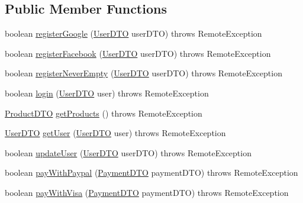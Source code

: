 \subsection*{Public Member Functions}
\begin{DoxyCompactItemize}
\item 
boolean \mbox{\hyperlink{interface_s_p_q_1_1remote_1_1_i_never_empty_facade_a93f3250c09a26fdb1d65219599dfd542}{register\+Google}} (\mbox{\hyperlink{class_s_p_q_1_1dto_1_1_user_d_t_o}{User\+D\+TO}} user\+D\+TO)  throws Remote\+Exception
\item 
boolean \mbox{\hyperlink{interface_s_p_q_1_1remote_1_1_i_never_empty_facade_a7b2f025522489fe9070d09a4fb08f0a1}{register\+Facebook}} (\mbox{\hyperlink{class_s_p_q_1_1dto_1_1_user_d_t_o}{User\+D\+TO}} user\+D\+TO)  throws Remote\+Exception
\item 
boolean \mbox{\hyperlink{interface_s_p_q_1_1remote_1_1_i_never_empty_facade_a7867e1e698fea32a535a1daeda4e8d6a}{register\+Never\+Empty}} (\mbox{\hyperlink{class_s_p_q_1_1dto_1_1_user_d_t_o}{User\+D\+TO}} user\+D\+TO)  throws Remote\+Exception
\item 
boolean \mbox{\hyperlink{interface_s_p_q_1_1remote_1_1_i_never_empty_facade_a2440fa36695c63e4e4c30fc25965f853}{login}} (\mbox{\hyperlink{class_s_p_q_1_1dto_1_1_user_d_t_o}{User\+D\+TO}} user)  throws Remote\+Exception
\item 
\mbox{\hyperlink{class_s_p_q_1_1dto_1_1_product_d_t_o}{Product\+D\+TO}} \mbox{\hyperlink{interface_s_p_q_1_1remote_1_1_i_never_empty_facade_a62d4a1747b8ba90f451fc9f9343055f3}{get\+Products}} ()  throws Remote\+Exception
\item 
\mbox{\hyperlink{class_s_p_q_1_1dto_1_1_user_d_t_o}{User\+D\+TO}} \mbox{\hyperlink{interface_s_p_q_1_1remote_1_1_i_never_empty_facade_aa329dfc23ab0832e73802bf2df90b9e0}{get\+User}} (\mbox{\hyperlink{class_s_p_q_1_1dto_1_1_user_d_t_o}{User\+D\+TO}} user)  throws Remote\+Exception
\item 
boolean \mbox{\hyperlink{interface_s_p_q_1_1remote_1_1_i_never_empty_facade_add6dafb25f59c549e924c76c6e8f31c6}{update\+User}} (\mbox{\hyperlink{class_s_p_q_1_1dto_1_1_user_d_t_o}{User\+D\+TO}} user\+D\+TO)  throws Remote\+Exception
\item 
boolean \mbox{\hyperlink{interface_s_p_q_1_1remote_1_1_i_never_empty_facade_a2d34c64f91537d8c7138094e418de785}{pay\+With\+Paypal}} (\mbox{\hyperlink{class_s_p_q_1_1dto_1_1_payment_d_t_o}{Payment\+D\+TO}} payment\+D\+TO)  throws Remote\+Exception
\item 
boolean \mbox{\hyperlink{interface_s_p_q_1_1remote_1_1_i_never_empty_facade_a3b7058d95e7b73bdcc09220ecfc2d744}{pay\+With\+Visa}} (\mbox{\hyperlink{class_s_p_q_1_1dto_1_1_payment_d_t_o}{Payment\+D\+TO}} payment\+D\+TO)  throws Remote\+Exception
\end{DoxyCompactItemize}


